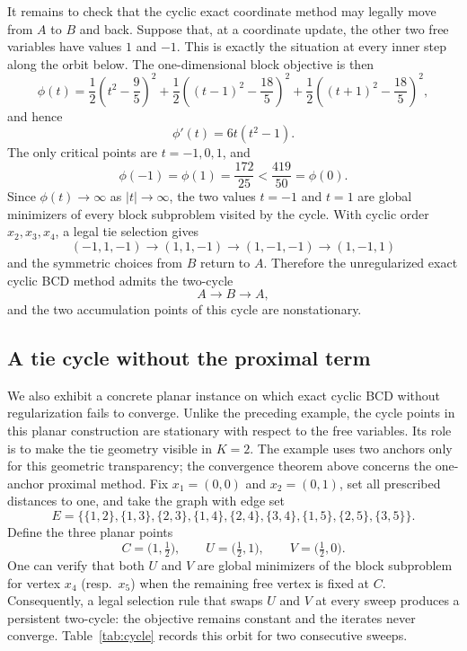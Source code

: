 \documentclass[11pt]{article}
\begin{document}
It remains to check that the cyclic exact coordinate method may legally move from \(A\) to \(B\) and back.  Suppose that, at a coordinate update, the other two free variables have values \(1\) and \(-1\).  This is exactly the situation at every inner step along the orbit below.  The one-dimensional block objective is then
\[
    \phi(t)
    =
    \frac12\left(t^2-\frac95\right)^2
    +
    \frac12\left((t-1)^2-\frac{18}{5}\right)^2
    +
    \frac12\left((t+1)^2-\frac{18}{5}\right)^2,
\]
and hence
\[
    \phi'(t)=6t(t^2-1).
\]
The only critical points are \(t=-1,0,1\), and
\[
    \phi(-1)=\phi(1)=\frac{172}{25}
    <
    \frac{419}{50}
    =
    \phi(0).
\]
Since \(\phi(t)\to\infty\) as \(|t|\to\infty\), the two values \(t=-1\) and \(t=1\) are global minimizers of every block subproblem visited by the cycle.  With cyclic order \(x_2,x_3,x_4\), a legal tie selection gives
\[
    (-1,1,-1)
    \longrightarrow
    (1,1,-1)
    \longrightarrow
    (1,-1,-1)
    \longrightarrow
    (1,-1,1)
\]
and the symmetric choices from \(B\) return to \(A\).  Therefore the unregularized exact cyclic BCD method admits the two-cycle
\[
    A\longrightarrow B\longrightarrow A,
\]
and the two accumulation points of this cycle are nonstationary.

\subsection{A tie cycle without the proximal term}
\label{subsec:cycle}

We also exhibit a concrete planar instance on which exact cyclic BCD without regularization fails to converge.  Unlike the preceding example, the cycle points in this planar construction are stationary with respect to the free variables.  Its role is to make the tie geometry visible in \(K=2\).  The example uses two anchors only for this geometric transparency; the convergence theorem above concerns the one-anchor proximal method.  Fix \(x_1=(0,0)\) and \(x_2=(0,1)\), set all prescribed distances to one, and take the graph with edge set
\[
    E=\bigl\{\{1,2\},\{1,3\},\{2,3\},\{1,4\},\{2,4\},\{3,4\},\{1,5\},\{2,5\},\{3,5\}\bigr\}.
\]
Define the three planar points
\[
    C=\bigl(1,\tfrac{1}{2}\bigr),\qquad
    U=\bigl(\tfrac{1}{2},1\bigr),\qquad
    V=\bigl(\tfrac{1}{2},0\bigr).
\]
One can verify that both \(U\) and \(V\) are global minimizers of the block subproblem for vertex \(x_4\) (resp.\ \(x_5\)) when the remaining free vertex is fixed at \(C\).  Consequently, a legal selection rule that swaps \(U\) and \(V\) at every sweep produces a persistent two-cycle: the objective remains constant and the iterates never converge.  Table~\ref{tab:cycle} records this orbit for two consecutive sweeps.
\end{document}

